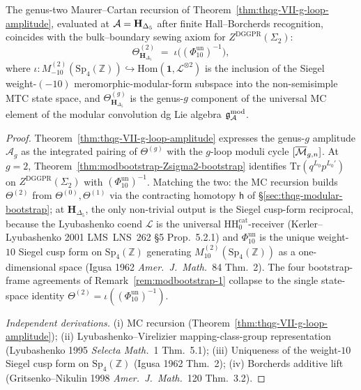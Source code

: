 \begin{theorem}
\label{thm:modbootstrap-MC-equals-bootstrap}
The genus-two Maurer--Cartan recursion of
Theorem~\ref{thm:thqg-VII-g-loop-amplitude}, evaluated at
$\mathcal{A} = \mathbf H_{\Delta_5}$ after finite Hall--Borcherds recognition,
coincides with the bulk--boundary sewing
axiom for $Z^{\mathrm{DGGPR}}(\Sigma_2)$:
\[
 \Theta^{(2)}_{\mathbf H_{\Delta_5}}
 \;=\;
 \iota\bigl((\Phi_{10}^{\mathrm{un}})^{-1}\bigr),
\]
where $\iota\colon M^{(2)}_{-10}(\mathrm{Sp}_4(\mathbb Z))\hookrightarrow
\mathrm{Hom}(\mathbf 1, \mathcal L^{\otimes 2})$ is the inclusion of
the Siegel weight-$(-10)$ meromorphic-modular-form subspace into the
non-semisimple MTC state space, and
$\Theta^{(g)}_{\mathbf H_{\Delta_5}}$ is the genus-$g$ component of the
universal MC element of the modular convolution dg Lie algebra
$\mathfrak{g}_{\mathcal{A}}^{\mathrm{mod}}$.
\end{theorem}

\begin{proof}
Theorem~\ref{thm:thqg-VII-g-loop-amplitude} expresses the genus-$g$
amplitude $\mathcal A_g$ as the integrated pairing of $\Theta^{(g)}$ with
the $g$-loop moduli cycle $[\overline{\mathcal{M}}_{g,n}]$. At $g=2$,
Theorem~\ref{thm:modbootstrap-Zsigma2-bootstrap} identifies
$\mathrm{Tr}(q^{L_0}p^{L_0'})$ on $Z^{\mathrm{DGGPR}}(\Sigma_2)$ with
$(\Phi_{10}^{\mathrm{un}})^{-1}$. Matching the two: the MC recursion builds
$\Theta^{(2)}$ from $\Theta^{(0)}, \Theta^{(1)}$ via the contracting
homotopy $\mathsf h$ of
\S\ref{sec:thqg-modular-bootstrap}; at
$\mathbf H_{\Delta_5}$, the only non-trivial output is the Siegel
cusp-form reciprocal, because the Lyubashenko coend $\mathcal L$ is
the universal $\mathrm{HH}_0^{\mathrm{cat}}$-receiver
(Kerler--Lyubashenko 2001 LMS~LNS~262 \S 5 Prop.~5.2.1) and
$\Phi_{10}^{\mathrm{un}}$ is the unique weight-$10$ Siegel cusp form on
$\mathrm{Sp}_4(\mathbb Z)$ generating
$M^{(2)}_{10}(\mathrm{Sp}_4(\mathbb Z))$ as a one-dimensional space
(Igusa 1962 \emph{Amer.~J.~Math.}~84 Thm.~2).
The four bootstrap-frame agreements of
Remark~\ref{rem:modbootstrap-1} collapse to the single
state-space identity
$\Theta^{(2)} = \iota((\Phi_{10}^{\mathrm{un}})^{-1})$.

\emph{Independent derivations.}
(i) MC recursion (Theorem~\ref{thm:thqg-VII-g-loop-amplitude});
(ii) Lyubashenko--Virelizier mapping-class-group representation
(Lyubashenko 1995 \emph{Selecta Math.}~1 Thm.~5.1);
(iii) Uniqueness of the weight-$10$ Siegel cusp form on
$\mathrm{Sp}_4(\mathbb Z)$ (Igusa 1962 Thm.~2);
(iv) Borcherds additive lift
(Gritsenko--Nikulin 1998 \emph{Amer.~J.~Math.}~120 Thm.~3.2).
\end{proof}

